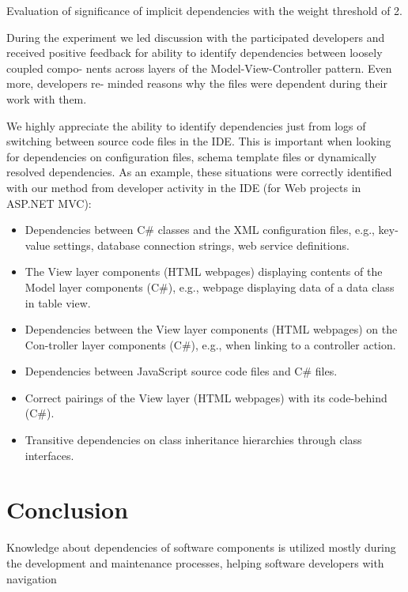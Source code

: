 \documentclass[a4paper]{llncs}
\begin{document}
 \begin{table}
\centering
\caption{Evaluation of significance of implicit dependencies with the weight threshold of 2.}

\end{table}
 
\noindent 
During the experiment we led discussion with the participated developers and received positive feedback for ability to identify dependencies between loosely coupled compo- nents across layers of the Model-View-Controller pattern. Even more, developers re- minded reasons why the files were dependent during their work with them.

We highly appreciate the ability to identify dependencies just from logs of switching between source code files in the IDE. This is important when looking for dependencies on configuration files, schema template files or dynamically resolved dependencies. As an example, these situations were correctly identified with our method from developer activity in the IDE (for Web projects in ASP.NET MVC):

\begin{itemize}
\item
Dependencies between C\# classes and the XML configuration files, e.g., key-value settings, database connection strings, web service definitions.
\item
The View layer components (HTML webpages) displaying contents of the Model layer components (C\#), e.g., webpage displaying data of a data class in table view.
\item
Dependencies between the View layer components (HTML webpages) on the Con-troller layer components (C\#), e.g., when linking to a controller action.
\item
Dependencies between JavaScript source code files and C\# files.
\item
Correct pairings of the View layer (HTML webpages) with its code-behind (C\#).
\item
Transitive dependencies on class inheritance hierarchies through class interfaces.
\end{itemize}

\section{Conclusion}
Knowledge about dependencies of software components is utilized mostly during the development and maintenance processes, helping software developers with navigation
\end{document}
